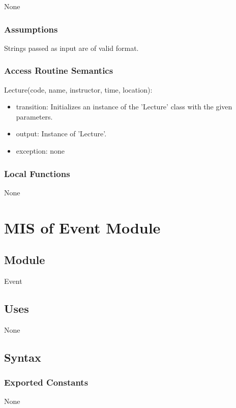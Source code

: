 \documentclass[12pt, titlepage]{article}
\begin{document}
None

\subsubsection{Assumptions}

Strings passed as input are of valid format.

\subsubsection{Access Routine Semantics}

\noindent Lecture(code, name, instructor, time, location):
\begin{itemize}
\item transition: Initializes an instance of the 'Lecture' class with the given parameters.
\item output: Instance of 'Lecture'.
\item exception: none
\end{itemize}

\subsubsection{Local Functions}

None

\newpage

\section{MIS of Event Module} \label{mEvent}

\subsection{Module}

Event

\subsection{Uses}

None

\subsection{Syntax}

\subsubsection{Exported Constants}
None
\end{document}
